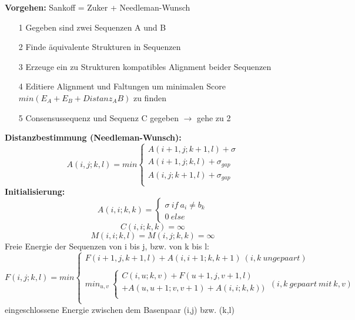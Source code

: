 \textbf{Vorgehen:} Sankoff = Zuker + Needleman-Wunsch
\begin{itemize}
\item[1] Gegeben sind zwei Sequenzen A und B
\item[2] Finde äquivalente Strukturen in Sequenzen
\item[3] Erzeuge ein zu Strukturen kompatibles Alignment beider Sequenzen
\item[4] Editiere Alignment und Faltungen um minimalen Score $min(E_A + E_B + Distanz_AB)$ zu finden
\item[5] Consensussequenz und Sequenz C gegeben $\rightarrow$ gehe zu 2
\end{itemize}
\textbf{Distanzbestimmung (Needleman-Wunsch):}
\begin{equation}
A(i,j;k,l)= min \begin{cases} 
A(i+1,j;k+1,l) + \sigma \\
A(i+1,j;k,l) + \sigma_{gap} \\
A(i,j;k+1,l) + \sigma_{gap} \\
\end{cases}
\end{equation}
\textbf{Initialisierung:}
\begin{equation}
	A(i,i;k,k) =
	\begin{cases}
		\sigma \ if~a_i \ne b_k \\
		0 \ else
	\end{cases}
\end{equation}
\begin{equation}
C(i,i;k,k) = \infty
\end{equation}
\begin{equation}
M(i,i;k,l) = M(i,j;k,k) = \infty
\end{equation}
Freie Energie der Sequenzen von i bis j, bzw. von k bis l:
\begin{equation}
F(i,j;k,l)= min \begin{cases}
F(i+1,j,k+1,l) + A(i,i+1; k,k+1) \ (i,k \ ungepaart) \\
\\
min_{u,v}\ 
\begin{cases}
	C(i,u;k,v) + F(u+1,j,v+1,l) \\
	+ A(u,u+1;v,v+1) + A(i,i; k,k)) \\ 
\end{cases}
\ (i,k \ gepaart \ mit \ k,v)\\
\end{cases}
\end{equation}
eingeschlossene Energie zwischen dem Basenpaar (i,j) bzw. (k,l)
